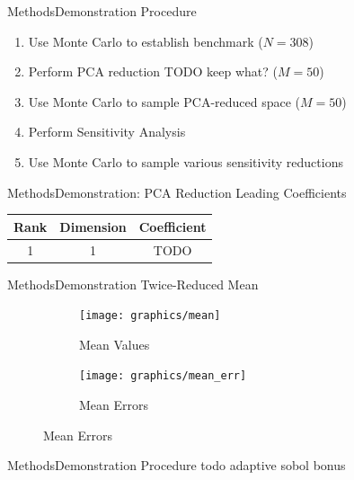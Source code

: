 \documentclass{beamer}
\begin{document}
\begin{frame}{Methods}{Demonstration Procedure}\vspace{-30pt}
  \begin{enumerate}
    \item Use Monte Carlo to establish benchmark ($N=308$)
    \item Perform PCA reduction TODO keep what? ($M=50$)
    \item Use Monte Carlo to sample PCA-reduced space ($M=50$)
    \item Perform Sensitivity Analysis
    \item Use Monte Carlo to sample various sensitivity reductions
  \end{enumerate}
\end{frame}

\begin{frame}{Methods}{Demonstration: PCA Reduction}\vspace{-30pt}
  Leading Coefficients
  \begin{tabular}{c|c|c}
    Rank & Dimension & Coefficient \\ \hline
    1 & 1 & TODO
  \end{tabular}
\end{frame}

\begin{frame}{Methods}{Demonstration Twice-Reduced Mean}\vspace{-30pt}
  \begin{figure}[h!]
    \centering
    \begin{subfigure}[b]{0.49\textwidth}
      \texttt{[image: graphics/mean]}
      \caption{Mean Values}
      \label{twice 9v mean val}
    \end{subfigure}
    \begin{subfigure}[b]{0.49\textwidth}
      \texttt{[image: graphics/mean\_err]}
      \caption{Mean Errors}
      \label{twice 9v mean err}
    \end{subfigure}
  \end{figure}
\end{frame}

\begin{frame}{Methods}{Demonstration Procedure}\vspace{-30pt}
  todo adaptive sobol bonus
\end{frame}
\end{document}
